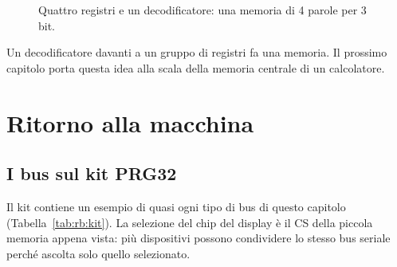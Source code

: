 \begin{figure}[htb]
\centering
{}
\caption{Quattro registri e un decodificatore: una memoria di 4 parole per 3 bit.}
\label{fig:rb:mem}
\end{figure}

\begin{prgconcept}
Un decodificatore davanti a un gruppo di registri fa una memoria. Il prossimo
capitolo porta questa idea alla scala della memoria centrale di un calcolatore.
\end{prgconcept}

\section{Ritorno alla macchina}

\subsection{I bus sul kit PRG32}

Il kit contiene un esempio di quasi ogni tipo di bus di questo capitolo
(Tabella~\ref{tab:rb:kit}). La selezione del chip del display è il CS della
piccola memoria appena vista: più dispositivi possono condividere lo stesso bus
seriale perché ascolta solo quello selezionato.

